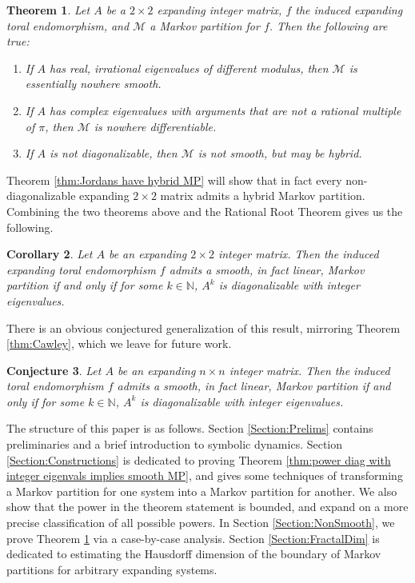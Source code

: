 \documentclass{article}
\def\N{\mathbb{N}}
\def\M{\mathcal{M}}
\newtheorem{theorem}{Theorem}[section]
\newtheorem{corollary}[theorem]{Corollary}
\newtheorem{conjecture}[theorem]{Conjecture}
\begin{document}
\begin{theorem}\label{thm:nonsmoothness in dimension 2}
    Let $A$ be a $2\times 2$ expanding integer matrix, $f$ the induced expanding toral endomorphism, and $\M$ a Markov partition for $f$. Then the following are true: \begin{enumerate}
        \item If $A$ has real, irrational eigenvalues of different modulus, then $\M$ is essentially nowhere smooth.
        \item If $A$ has complex eigenvalues with arguments that are not a rational multiple of $\pi$, then $\M$ is nowhere differentiable.
        \item If $A$ is not diagonalizable, then $\M$ is not smooth, but may be hybrid.
    \end{enumerate}
\end{theorem}

Theorem \ref{thm:Jordans have hybrid MP} will show that in fact every non-diagonalizable expanding $2\times 2$ matrix admits a hybrid Markov partition. Combining the two theorems above and the Rational Root Theorem gives us the following.
\begin{corollary}
    Let $A$ be an expanding $2\times 2$ integer matrix. Then the induced expanding toral endomorphism $f$ admits a smooth, in fact linear, Markov partition if and only if for some $k\in \N$, $A^k$ is diagonalizable with integer eigenvalues.
\end{corollary}

There is an obvious conjectured generalization of this result, mirroring Theorem \ref{thm:Cawley}, which we leave for future work.

\begin{conjecture}
    Let $A$ be an expanding $n\times n$ integer matrix. Then the induced toral endomorphism $f$ admits a smooth, in fact linear, Markov partition if and only if for some $k\in \N$, $A^k$ is diagonalizable with integer eigenvalues.
\end{conjecture}

The structure of this paper is as follows. Section \ref{Section:Prelims} contains preliminaries and a brief introduction to symbolic dynamics. Section \ref{Section:Constructions} is dedicated to proving Theorem \ref{thm:power diag with integer eigenvals implies smooth MP}, and gives some techniques of transforming a Markov partition for one system into a Markov partition for another. We also show that the power in the theorem statement is bounded, and expand on a more precise classification of all possible powers. In Section \ref{Section:NonSmooth}, we prove Theorem \ref{thm:nonsmoothness in dimension 2} via a case-by-case analysis. Section \ref{Section:FractalDim} is dedicated to estimating the Hausdorff dimension of the boundary of Markov partitions for arbitrary expanding systems. 
\end{document}
